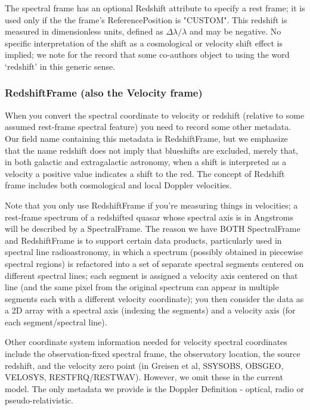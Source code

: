 \documentclass[11pt]{article}
\begin{document}
The spectral frame has an optional Redshift attribute to specify a rest
frame; it is used only if the the frame's ReferencePosition is "CUSTOM".
This redshift is measured in dimensionless units, defined as
$\Delta\lambda/\lambda$ and may be negative. No specific interpretation
of the shift as a cosmological or velocity shift effect is implied;
we note for the record that some co-authors object to using the word `redshift'
in this generic sense.

\subsubsection{RedshiftFrame (also the Velocity frame)}

When you convert the spectral coordinate to velocity or redshift
(relative to some assumed rest-frame spectral feature) you need
to record some other metadata. Our field name containing this
metadata is RedshiftFrame, but we emphasize that the name redshift
does not imply that blueshifts are excluded, merely that, in both
galactic and extragalactic astronomy, when a shift is interpreted
as a velocity a positive value indicates a shift to the red.
The concept of Redshift frame includes both cosmological and
local Doppler velocities.

Note that you only use RedshiftFrame if you're measuring things
in velocities; a rest-frame spectrum of a redshifted quasar
whose spectral axis is in Angstroms will be described by a SpectralFrame.
The reason we have BOTH SpectralFrame and RedshiftFrame is to support
certain data products, particularly used in spectral line radioastronomy,
in which a spectrum (possibly obtained in piecewise spectral regions)
is refactored into a set of separate spectral segments 
centered on different spectral lines; each segment is assigned a velocity
axis centered on that line (and the same pixel from the original spectrum
can appear in multiple segments each with a different velocity coordinate);
you then consider the data as a 2D array with a spectral axis (indexing the
segments) and a velocity axis (for each segment/spectral line).

Other coordinate system information needed for velocity spectral coordinates
include the observation-fixed spectral frame, the observatory location,
the source redshift, and the velocity zero point (in Greisen et al,
SSYSOBS, OBSGEO, VELOSYS, RESTFRQ/RESTWAV). However, we omit these
in the current model.
The only metadata we provide is the Doppler Definition - optical,
radio or pseudo-relativistic.
\end{document}
